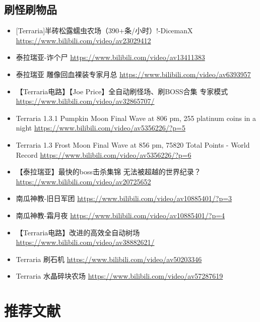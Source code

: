 \section{刷怪刷物品}
\begin{itemize}
\item {[}Terraria]半砖松露蠕虫农场（390+条/小时）!-DicemanX \url{https://www.bilibili.com/video/av23029412}
\item 泰拉瑞亚-诈个尸 \url{https://www.bilibili.com/video/av13411383}
\item 泰拉瑞亚 雕像回血裸装专家月总 \url{https://www.bilibili.com/video/av6393957}
\item 【Terraria电路】【Joe Price】全自动刷怪场、刷BOSS合集 专家模式 \url{https://www.bilibili.com/video/av32865707/}
\item Terraria 1.3.1 Pumpkin Moon Final Wave at 806 pm, 255 platinum coins in a night \url{https://www.bilibili.com/video/av5356226/?p=5}
\item Terraria 1.3 Frost Moon Final Wave at 856 pm, 75820 Total Points - World Record \url{https://www.bilibili.com/video/av5356226/?p=6}
\item 【泰拉瑞亚】最快的boss击杀集锦 无法被超越的世界纪录？ \url{https://www.bilibili.com/video/av20725652}
\item 南瓜神教-旧日军团 \url{https://www.bilibili.com/video/av10885401/?p=3}
\item 南瓜神教-霜月夜 \url{https://www.bilibili.com/video/av10885401/?p=4}
\item 【Terraria电路】改进的高效全自动树场 \url{https://www.bilibili.com/video/av38882621/}
\item Terraria 刷石机 \url{https://www.bilibili.com/video/av50203346}
\item Terraria 水晶碎块农场 \url{https://www.bilibili.com/video/av57287619}
\end{itemize}

\chapter{推荐文献}

